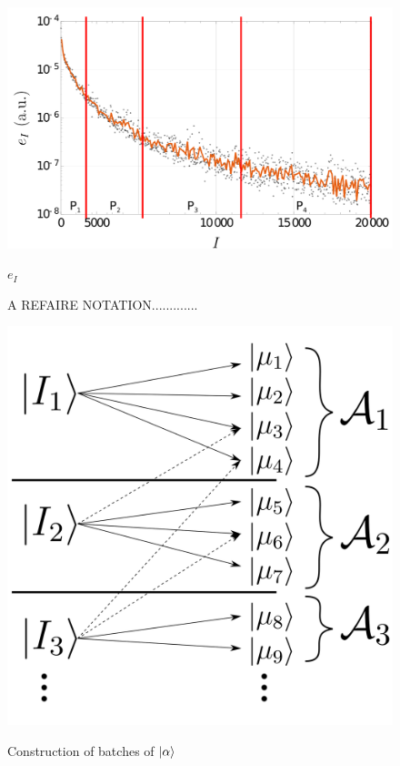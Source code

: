 \documentclass[./thesis.tex]{subfiles}
\begin{document}
\begin{figure}[h!]
	\begin{center}
		\includegraphics[width=0.9\columnwidth]{figures/pt2/P_i}
		\caption{A REFAIRE NOTATION.............}
		\label{fig:p_i}
		$e_I$
	\end{center}
\end{figure}



\begin{figure}[h!]
	\begin{center}
		\includegraphics[width=0.5\columnwidth]{figures/pt2/mu_sample}
		\caption{}
		\label{fig:mu_sample}
		Construction of batches of $\ket \alpha$
	\end{center}
\end{figure}

\clearpage
\end{document}
